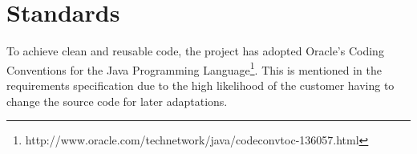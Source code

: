 \section{Standards}
To achieve clean and reusable code, the project has adopted Oracle's Coding Conventions for the Java Programming Language\footnote{http://www.oracle.com/technetwork/java/codeconvtoc-136057.html}. This is mentioned in the requirements specification due to the high likelihood of the customer having to change the source code for later adaptations.
